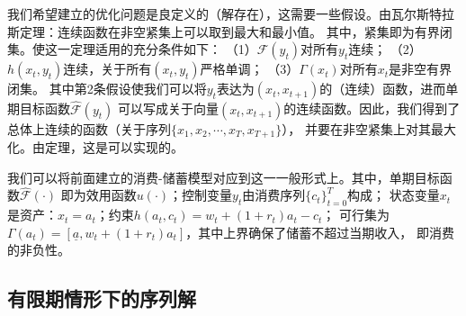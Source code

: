 我们希望建立的优化问题是良定义的（解存在），这需要一些假设。由瓦尔斯特拉斯定理：连续函数在非空紧集上可以取到最大和最小值。
其中，紧集即为有界闭集。使这一定理适用的充分条件如下：
（1）$\hat{\mathcal{F}}\left(y_t\right)$对所有$y_t$连续；
（2）$h(x_t,y_t)$连续，关于所有$(x_t,y_t)$严格单调；
（3）$\Gamma\left(x_t\right)$对所有$x_t$是非空有界闭集。
其中第2条假设使我们可以将$y_t$表达为$(x_t,x_{t+1})$的（连续）函数，进而单期目标函数$\hat{\mathcal{F}}\left(y_t\right)$
可以写成关于向量$(x_t,x_{t+1})$的连续函数。因此，我们得到了总体上连续的函数（关于序列$\{x_1,x_2,\cdots,x_T,x_{T+1}\}$），
并要在非空紧集上对其最大化。由定理，这是可以实现的。

我们可以将前面建立的消费-储蓄模型对应到这一一般形式上。其中，单期目标函数$\hat{\mathcal{F}}\left(\cdot\right)$
即为效用函数$u\left(\cdot\right)$；控制变量$y_t$由消费序列$\{c_t\}_{t=0}^T$构成；
状态变量$x_t$是资产：$x_t=a_t$；约束$h(a_t,c_t)=w_t+(1+r_t)a_t-c_t$；
可行集为$\Gamma\left(a_t\right)=\left[\underline{a}, w_t+\left(1+r_t\right) a_t\right]$，其中上界确保了储蓄不超过当期收入，
即消费的非负性。


\subsection{有限期情形下的序列解}

